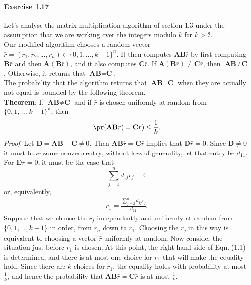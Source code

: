 \paragraph{Exercise 1.17} Let's analyse the matrix multiplication algorithm of
section 1.3 under the assumption that we are working over the integers modulo $k$
for $k > 2$. \\
Our modified algorithm chooses a random vector $\bar{r} = (r_1, r_2, ..., r_n)
\in \{ 0, 1, ..., k-1 \} ^n$. It then computes $\textbf{AB}\bar{r}$ by first
computing $\textbf{B}\bar{r}$ and then $\textbf{A}(\textbf{B} \bar{r})$, and it
also computes $\textbf{C} \bar{r}$. If $\textbf{A}(\textbf{B}\bar{r}) \not=
\textbf{C}\bar{r}$, then $\textbf{AB} \not= \textbf{C}$. Otherwise, it returns
that $\textbf{AB} = \textbf{C}$. \\
The probability that the algorithm returns that $\textbf{AB} = \textbf{C}$ when
they are actually not equal is bounded by the following theorem. \\
\textbf{Theorem}: If $\textbf{AB} \not= \textbf{C}$ and if $\bar{r}$ is chosen
uniformly at random from $\{ 0, 1, ..., k-1 \} ^n$, then
\[ \pr(\textbf{AB}\bar{r}) = \textbf{C}\bar{r}) \leq \frac{1}{k}. \]
\textit{Proof}. Let $\textbf{D} = \textbf{AB} - \textbf{C} \not= 0$. Then
$\textbf{AB}\bar{r} = \textbf{C}\bar{r}$ implies that $\textbf{D}\bar{r} = 0$.
Since $\textbf{D} \not= 0$ it must have some nonzero entry; without loss of
generality, let that entry be $d_{11}$. \\
For $\textbf{D}\bar{r} = 0$, it must be the case that
\[ \sum_{j=1}^n d_{1j}r_j = 0 \]
or, equivalently,
\begin{align} r_1 = \frac{\sum_{j=2}^n d_{1j}r_j}{d_{11}}. \end{align}
Suppose that we choose the $r_j$ independently and uniformly at random from
$\{ 0, 1, ..., k-1 \}$ in order, from $r_n$ down to $r_1$. Choosing the $r_j$ in
this way is equivalent to choosing a vector $\bar{r}$ uniformly at random. Now
consider the situation just before $r_1$ is chosen. At this point, the right-hand
side of Eqn. (1.1) is determined, and there is at most one choice for $r_1$ that
will make the equality hold. Since there are $k$ choices for $r_1$, the equality
holds with probability at most $\frac{1}{k}$, and hence the probability that
$\textbf{AB}\bar{r} = \textbf{C}\bar{r}$ is at most $\frac{1}{k}$.

